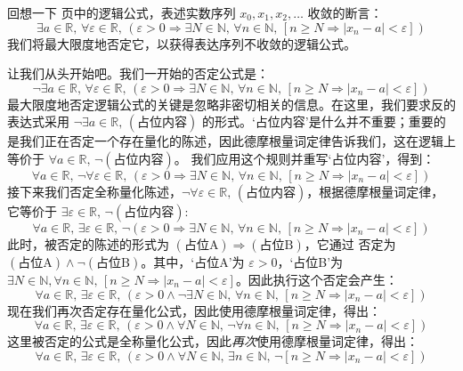 \begin{example}
回想一下 \pageref{pConvergencePreliminary} 页中的逻辑公式，表述实数序列 $x_0, x_1, x_2, \dots$ 收敛的断言：
\[ \exists a \in \mathbb{R},\, \forall \varepsilon \in \mathbb{R},\, (\varepsilon > 0 \Rightarrow \exists N \in \mathbb{N},\, \forall n \in \mathbb{N},\, [n \ge N \Rightarrow |x_n-a| < \varepsilon])\]
我们将最大限度地否定它，以获得表达序列不收敛的逻辑公式。

让我们从头开始吧。我们一开始的否定公式是：
\[ \neg \exists a \in \mathbb{R},\, \forall \varepsilon \in \mathbb{R},\, (\varepsilon > 0 \Rightarrow \exists N \in \mathbb{N},\, \forall n \in \mathbb{N},\, [n \ge N \Rightarrow |x_n-a| < \varepsilon])\]
%
最大限度地否定逻辑公式的关键是忽略非密切相关的信息。在这里，我们要求反的表达式采用 $\neg \exists a \in \mathbb{R},\, (\text{占位内容})$ 的形式。`占位内容'是什么并不重要；重要的是我们正在否定一个存在量化的陈述，因此德摩根量词定律告诉我们，这在逻辑上等价于 $\forall a \in \mathbb{R},\, \neg (\text{占位内容})$。 我们应用这个规则并重写`占位内容'，得到：
\[ \forall a \in \mathbb{R},\, \neg \forall \varepsilon \in \mathbb{R},\, (\varepsilon > 0 \Rightarrow \exists N \in \mathbb{N},\, \forall n \in \mathbb{N},\, [n \ge N \Rightarrow |x_n-a| < \varepsilon])\]
%
接下来我们否定全称量化陈述，$\neg \forall \varepsilon \in \mathbb{R},\, (\text{占位内容})$，根据德摩根量词定律，它等价于 $\exists \varepsilon \in \mathbb{R},\, \neg (\text{占位内容})$:
\[ \forall a \in \mathbb{R},\, \exists \varepsilon \in \mathbb{R},\, \neg (\varepsilon > 0 \Rightarrow \exists N \in \mathbb{N},\, \forall n \in \mathbb{N},\, [n \ge N \Rightarrow |x_n-a| < \varepsilon])\]
%
此时，被否定的陈述的形式为 $(\text{占位A}) \Rightarrow (\text{占位B})$，它通过  否定为 $(\text{占位A}) \wedge \neg (\text{占位B})$。其中，`占位A'为 $\varepsilon > 0$，`占位B'为 $\exists N \in \mathbb{N}, \forall n \in \mathbb{N},\, [n \ge N \Rightarrow |x_n - a| < \varepsilon]$。因此执行这个否定会产生：
\[ \forall a \in \mathbb{R},\, \exists \varepsilon \in \mathbb{R},\, (\varepsilon > 0 \wedge \neg \exists N \in \mathbb{N},\, \forall n \in \mathbb{N},\, [n \ge N \Rightarrow |x_n-a| < \varepsilon])\]
%
现在我们再次否定存在量化公式，因此使用德摩根量词定律，得出：
\[ \forall a \in \mathbb{R},\, \exists \varepsilon \in \mathbb{R},\, (\varepsilon > 0 \wedge \forall N \in \mathbb{N},\, \neg \forall n \in \mathbb{N},\, [n \ge N \Rightarrow |x_n-a| < \varepsilon])\]
%
这里被否定的公式是全称量化公式，因此\textit{再次}使用德摩根量词定律，得出：
\[ \forall a \in \mathbb{R},\, \exists \varepsilon \in \mathbb{R},\, (\varepsilon > 0 \wedge \forall N \in \mathbb{N},\, \exists n \in \mathbb{N},\, \neg [n \ge N \Rightarrow |x_n-a| < \varepsilon])\]

\end{example}
